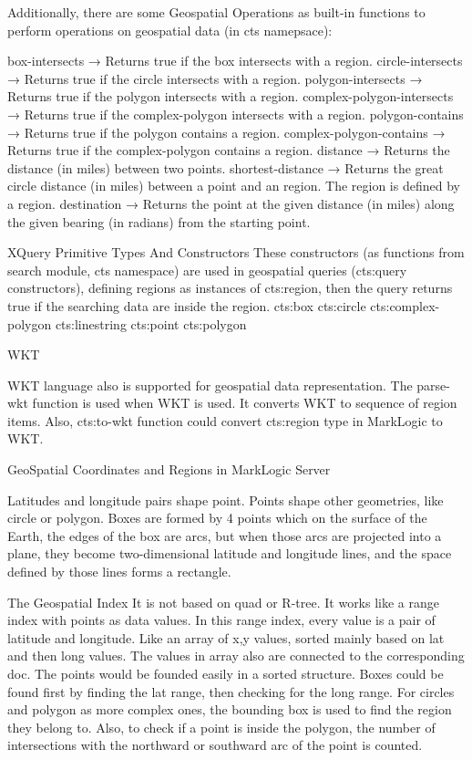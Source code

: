 \documentclass[a4paper,12pt]{article}
\begin{document}
Additionally, there are some Geospatial Operations as built-in functions to perform operations on geospatial data (in cts namepsace):

 box-intersects → Returns true if the box intersects with a region.
 circle-intersects → Returns true if the circle intersects with a region.
 polygon-intersects → Returns true if the polygon intersects with a region.
 complex-polygon-intersects → Returns true if the complex-polygon intersects with a region.
 polygon-contains → Returns true if the polygon contains a region.
 complex-polygon-contains → Returns true if the complex-polygon contains a region.
 distance → Returns the distance (in miles) between two points.
 shortest-distance → Returns the great circle distance (in miles) between a point and an region. The region is defined by a region.
 destination → Returns the point at the given distance (in miles) along the given bearing (in radians) from the starting point.


 XQuery Primitive Types And Constructors
These constructors (as functions from search module, cts namespace) are used in geospatial queries (cts:query constructors), defining regions as instances of cts:region, then the query returns true if the searching data are inside the region.
 cts:box 
 cts:circle
 cts:complex-polygon
 cts:linestring
 cts:point
 cts:polygon

 WKT

	WKT language also is supported for geospatial data representation. The parse-wkt function is used when WKT is used. It converts WKT to sequence of region items. Also, cts:to-wkt function could convert cts:region type in MarkLogic to WKT.

GeoSpatial Coordinates and Regions in MarkLogic Server


Latitudes and longitude pairs shape point. Points shape other geometries, like circle or polygon. Boxes are formed by 4 points which on the surface of the Earth, the edges of the box are arcs, but when those arcs are projected into a plane, they become two-dimensional latitude and longitude lines, and the space defined by those lines forms a rectangle.


The Geospatial Index
It is not based on quad or R-tree. It works like a range index with points as data values. In this range index, every value is a pair of latitude and longitude. Like an array of x,y values, sorted mainly based on lat and then long values. The values in array also are connected to the corresponding doc.
The points would be founded easily in a sorted structure. Boxes could be found first by finding the lat range, then checking for the long range. For circles and polygon as more complex ones, the bounding box is used to find the region they belong to. Also, to check if a point is inside the polygon, the number of intersections with the northward or southward arc of the point is counted. 
\end{document}
